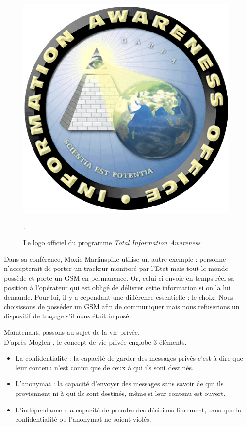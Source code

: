 \begin{figure}[h]
	\centering
	\includegraphics[scale=0.2]{figures/IAO-logo.png}
	\caption{\label{IAO_logo}Le logo officiel du programme \textit{Total Information Awareness}}.
\end{figure}

Dans sa conférence, Moxie Marlinspike utilise un autre exemple : personne n'accepterait de porter un trackeur monitoré par l'Etat mais tout le monde possède et porte un GSM en permanence. Or, celui-ci envoie en temps réel sa position à l'opérateur qui est obligé de délivrer cette information si on la lui demande. Pour lui, il y a cependant une différence essentielle : le choix. Nous choisissons de posséder un GSM afin de communiquer mais nous refuserions un dispositif de traçage s'il nous était imposé.
\newline


Maintenant, passons au sujet de la vie privée.\\
D'après Moglen \cite{Moglen_part2}, le concept de vie privée englobe 3 éléments.
\begin{itemize}
  \item La confidentialité : la capacité de garder des messages privés c'est-à-dire que leur contenu n'est connu que de ceux à qui ils sont destinés.
  \item L'anonymat : la capacité d'envoyer des messages sans savoir de qui ils proviennent ni à qui ils sont destinés, même si leur contenu est ouvert.
  \item L'indépendance : la capacité de prendre des décisions librement, sans que la confidentialité ou l'anonymat ne soient violés.
\end{itemize}

